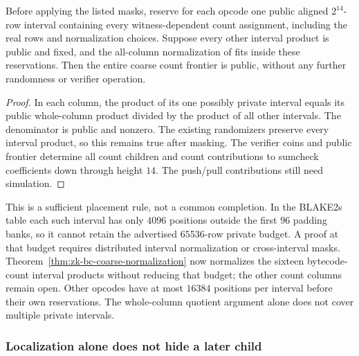 \begin{lemma}\label{lem:zk-localized-count-normalization}
Before applying the listed masks, reserve for each opcode one public aligned $2^{14}$-row interval containing every witness-dependent count assignment, including the real rows and normalization choices. Suppose every other interval product is public and fixed, and the all-column normalization of  fits inside these reservations. Then the entire coarse count frontier is public, without any further randomness or verifier operation.
\end{lemma}
\begin{proof}
In each column, the product of its one possibly private interval equals its public whole-column product divided by the product of all other intervals. The denominator is public and nonzero. The existing randomizers preserve every interval product, so this remains true after masking. The verifier coins and public frontier determine all count children and count contributions to sumcheck coefficients down through height $14$. The push/pull contributions still need simulation.
\end{proof}

This is a sufficient placement rule, not a common completion. In the BLAKE2s table each such interval has only $4096$ positions outside the first $96$ padding banks, so it cannot retain the advertised $65536$-row private budget. A proof at that budget requires distributed interval normalization or cross-interval masks. Theorem~\ref{thm:zk-bc-coarse-normalization} now normalizes the sixteen bytecode-count interval products without reducing that budget; the other count columns remain open. Other opcodes have at most $16384$ positions per interval before their own reservations. The whole-column quotient argument alone does not cover multiple private intervals.

\subsubsection{Localization alone does not hide a later child}

